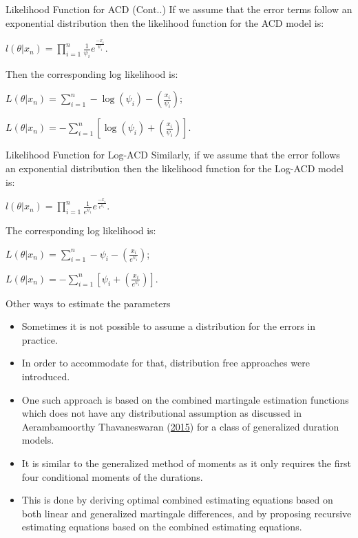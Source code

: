 \documentclass[
  ignorenonframetext,
]{beamer}
\begin{document}
\begin{frame}{Likelihood Function for ACD (Cont..)}
\protect\hypertarget{likelihood-function-for-acd-cont..}{}
If we assume that the error terms follow an exponential distribution
then the likelihood function for the ACD model is:

\(l(\theta|x_n)=\prod_{i=1}^n\frac{1}{\psi_i}e^{\frac{-x_i}{\psi_i}}\).

Then the corresponding log likelihood is:

\(L(\theta|x_n)=\sum_{i=1}^n-\log(\psi_i)-(\frac{x_i}{\psi_i})\);

\(L(\theta|x_n)=-\sum_{i=1}^n[\log(\psi_i)+(\frac{x_i}{\psi_i})]\).
\end{frame}

\begin{frame}{Likelihood Function for Log-ACD}
\protect\hypertarget{likelihood-function-for-log-acd}{}
Similarly, if we assume that the error follows an exponential
distribution then the likelihood function for the Log-ACD model is:

\(l(\theta|x_n)=\prod_{i=1}^n\frac{1}{e^{\psi_i}}e^{\frac{-x_i}{e^{\psi_i}}}\).

The corresponding log likelihood is:

\(L(\theta|x_n)=\sum_{i=1}^n-\psi_i-(\frac{x_i}{e^{\psi_i}})\);

\(L(\theta|x_n)=-\sum_{i=1}^n[\psi_i+(\frac{x_i}{e^{\psi_i}})]\).
\end{frame}

\begin{frame}{Other ways to estimate the parameters}
\protect\hypertarget{other-ways-to-estimate-the-parameters}{}
\begin{itemize}
\item
  Sometimes it is not possible to assume a distribution for the errors
  in practice.
\item
  In order to accommodate for that, distribution free approaches were
  introduced.
\item
  One such approach is based on the combined martingale estimation
  functions which does not have any distributional assumption as
  discussed in Aerambamoorthy Thavaneswaran
  (\protect\hyperlink{ref-EE}{2015}) for a class of generalized duration
  models.
\item
  It is similar to the generalized method of moments as it only requires
  the first four conditional moments of the durations.
\item
  This is done by deriving optimal combined estimating equations based
  on both linear and generalized martingale differences, and by
  proposing recursive estimating equations based on the combined
  estimating equations.
\end{itemize}
\end{frame}
\end{document}
